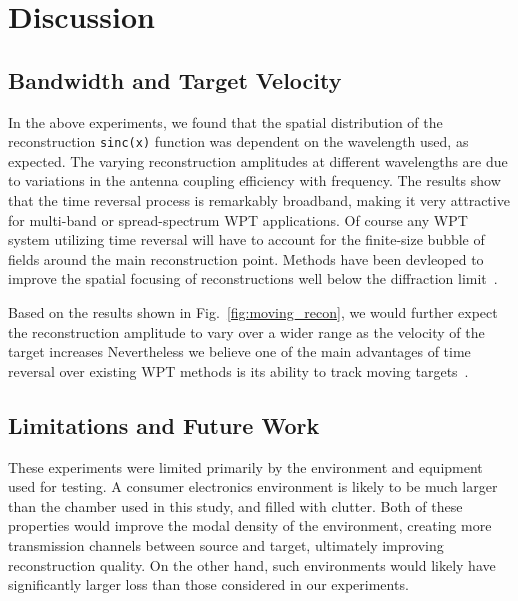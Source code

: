 \section{Discussion}

\subsection{Bandwidth and Target Velocity}
\label{sec:bandwidth}


In the above experiments, we found that the spatial distribution of the
reconstruction \texttt{sinc(x)} function was dependent on the wavelength used,
as expected.
%
The varying reconstruction amplitudes at different wavelengths are due to
variations in the antenna coupling efficiency with frequency.
%
The results show that the time reversal process is remarkably broadband, making
it very attractive for multi-band or spread-spectrum WPT applications.
%
Of course any WPT system utilizing time reversal will have to account for the
finite-size bubble of fields around the main reconstruction point.
%
Methods have been devleoped to improve the spatial focusing of reconstructions
well below the diffraction limit~\cite{lerosey-focusing}.



Based on the results shown in Fig.~\ref{fig:moving_recon}, we would further
expect the reconstruction amplitude to vary over a wider range as the velocity
of the target increases
%
Nevertheless we believe one of the main advantages of time reversal over
existing WPT methods is its ability to track moving
targets~\cite{fink,nltr-wave-chaotic}.

\subsection{Limitations and Future Work}
\label{sec:limitations}


These experiments were limited primarily by the environment and equipment used
for testing.
%
A consumer electronics environment is likely to be much larger than the chamber
used in this study, and filled with clutter.
%
Both of these properties would improve the modal density of the environment,
creating more transmission channels between source and target, ultimately
improving reconstruction quality.
%
On the other hand, such environments would likely have significantly larger loss
than those considered in our experiments.



